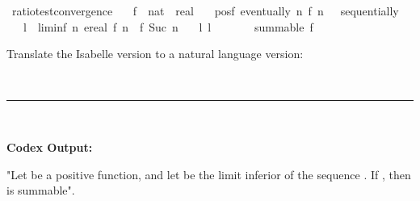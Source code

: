 \documentclass{article}
\begin{document}
\begin{boxB}
\begin{isabelle}
\isamarkupfalse \ ratio{\isacharunderscore}{\kern0pt}test{\isacharunderscore}{\kern0pt}convergence{\isacharcolon}{\kern0pt}\isanewline
\ \ \ f\ {\isacharcolon}{\kern0pt}{\isacharcolon}{\kern0pt}\ {\isachardoublequoteopen}nat\ {\isasymRightarrow}\ real{\isachardoublequoteclose}\isanewline
\ \ \ pos{\isacharunderscore}{\kern0pt}f{\isacharcolon}{\kern0pt}\ {\isachardoublequoteopen}eventually\ {\isacharparenleft}{\kern0pt}{\isasymlambda}n{\isachardot}{\kern0pt}\ f\ n\ {\isachargreater}{\kern0pt}\ {}{\isacharparenright}{\kern0pt}\ sequentially{\isachardoublequoteclose}\isanewline
\ \ \ {\isachardoublequoteopen}l\ {\isasymequiv}\ liminf\ {\isacharparenleft}{\kern0pt}{\isasymlambda}n{\isachardot}{\kern0pt}\ ereal\ {\isacharparenleft}{\kern0pt}f\ n\ {\isacharslash}{\kern0pt}\ f\ {\isacharparenleft}{\kern0pt}Suc\ n{\isacharparenright}{\kern0pt}{\isacharparenright}{\kern0pt}{\isacharparenright}{\kern0pt}{\isachardoublequoteclose}\isanewline
\ \ \ l{\isacharcolon}{\kern0pt}\ {\isachardoublequoteopen}l\ {\isachargreater}{\kern0pt}\ {}{\isachardoublequoteclose}\isanewline
\ \ \ \ \ {\isachardoublequoteopen}summable\ f{\isachardoublequoteclose}
\end{isabelle}
Translate the Isabelle version to a natural language version:

\
\hrule
\

\textbf{Codex Output:}

"Let  be a positive function, and let  be the limit inferior of the sequence . If , then  is summable".
\end{boxB}
\end{document}
